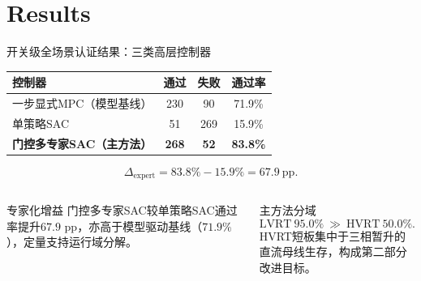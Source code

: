 \documentclass[10pt,aspectratio=169,mathserif]{beamer}
\begin{document}
\section{Results}

\begin{frame}{开关级全场景认证结果：三类高层控制器}
\begin{table}
\centering\small
\begin{tabular}{lccc}
\toprule
控制器 & 通过 & 失败 & 通过率 \\
\midrule
一步显式MPC（模型基线） & 230 & 90 & 71.9\% \\
单策略SAC & 51 & 269 & 15.9\% \\
\textbf{门控多专家SAC（主方法）} & \textbf{268} & \textbf{52} & \textbf{83.8\%} \\
\bottomrule
\end{tabular}
\end{table}

\[
\Delta_{\mathrm{expert}}=83.8\%-15.9\%=67.9~\mathrm{pp}.
\]

\begin{columns}[T,onlytextwidth]
\begin{block}{专家化增益}
门控多专家SAC较单策略SAC通过率提升$67.9$ pp，亦高于模型驱动基线（$71.9\%$），定量支持运行域分解。
\end{block}

\begin{block}{主方法分域}
\[
\text{LVRT}~95.0\%\ \gg\ \text{HVRT}~50.0\%.
\]
HVRT短板集中于三相暂升的直流母线生存，构成第二部分改进目标。
\end{block}
\end{columns}
\end{frame}
\end{document}
